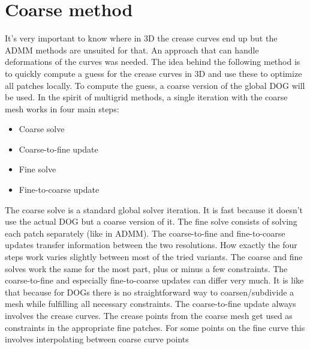 \documentclass[a4paper,twoside,12pt,nochapterprefix]{scrbook}
\begin{document}
\chapter{Coarse method}\label{sec:coarse}
It's very important to know where in 3D the crease curves end up but the ADMM methods are unsuited for that. An approach that can handle deformations of the curves was needed.\newline
The idea behind the following method is to quickly compute a guess for the crease curves in 3D and use these to optimize all patches locally. To compute the guess, a coarse version of the global DOG will be used.\newline
In the spirit of multigrid methods, a single iteration with the coarse mesh works in four main steps:\newline%
\begin{itemize}
\item Coarse solve
\item Coarse-to-fine update
\item Fine solve
\item Fine-to-coarse update
\end{itemize}
The coarse solve is a standard global solver iteration. It is fast because it doesn't use the actual DOG but a coarse version of it. The fine solve consists of solving each patch separately (like in ADMM). The coarse-to-fine and fine-to-coarse updates transfer information between the two resolutions.\newline
How exactly the four steps work varies slightly between most of the tried variants. The coarse and fine solves work the same for the most part, plus or minus a few constraints. The coarse-to-fine and especially fine-to-coarse updates can differ very much. It is like that because for DOGs there is no straightforward way to coarsen/subdivide a mesh while fulfilling all necessary constraints.\newline
The coarse-to-fine update always involves the crease curves. The crease points from the coarse mesh get used as constraints in the appropriate fine patches. For some points on the fine curve this involves interpolating between coarse curve points
\end{document}
